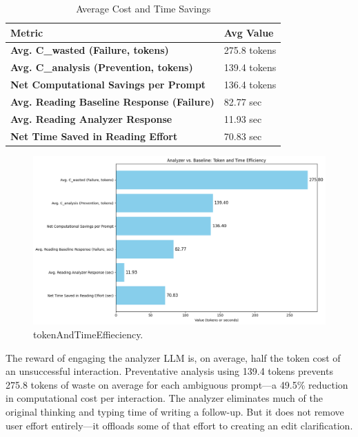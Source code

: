 \documentclass[11pt,a4paper]{article}
\begin{document}
\begin{table}[H]
\begin{center}
\small  %
\begin{tabular}{p{5.4cm}p{1.8cm}}
\hline \bf {Metric} & \bf {Avg Value} \\ \hline
\textbf{Avg. C\_wasted (Failure, tokens)} & 275.8 tokens \\
\textbf{Avg. C\_analysis (Prevention, tokens)} & 139.4 tokens \\
\textbf{Net Computational Savings per Prompt}  & 136.4 tokens \\
\textbf{Avg. Reading Baseline Response (Failure)} & 82.77 sec \\
\textbf{Avg. Reading Analyzer Response}  & 11.93 sec  \\
\textbf{Net Time Saved in Reading Effort} & 70.83 sec  \\ \bottomrule
\end{tabular}
\end{center}
\caption{\label{tab:results} Average Cost and Time Savings}
\end{table}

\begin{figure}[!t]
\centering
\includegraphics[width=\columnwidth]{images/Figure4.jpeg}
\caption{tokenAndTimeEffieciency.}
\label{fig_efficiency}
\end{figure}

The reward of engaging the analyzer LLM is, on average, half the token cost of an unsuccessful interaction. Preventative analysis using 139.4 tokens prevents 275.8 tokens of waste on average for each ambiguous prompt—a 49.5\% reduction in computational cost per interaction. The analyzer eliminates much of the original thinking and typing time of writing a follow-up. But it does not remove user effort entirely—it offloads some of that effort to creating an edit clarification.
\end{document}
